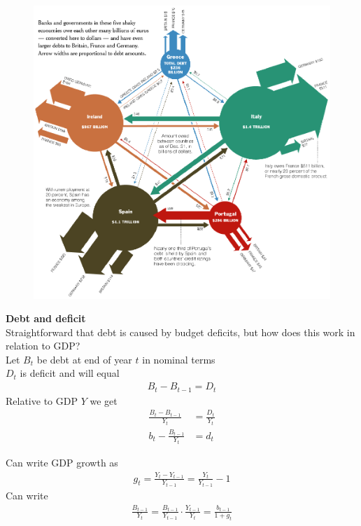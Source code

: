 \documentclass{beamer}
\begin{document}
\begin{frame}
  \begin{figure}
    \includegraphics[scale=.6]{debt_nyt.eps}
  \end{figure}
\end{frame}

\begin{frame}
  \textbf{Debt and deficit}\\
  Straightforward that debt is caused by budget deficits, but how does this work in relation to GDP?\\
  \medskip
  Let $B_t$ be debt at end of year $t$ in nominal terms\\
  $D_t$ is deficit and will equal
  \begin{align}
    B_t-B_{t-1}=D_t
 \end{align}  
  \medskip
  Relative to GDP $Y$ we get  
  \begin{align}
    \frac{B_t-B_{t-1}}{Y_t} &= \frac{D_t}{Y_t}\\
    b_t-\frac{B_{t-1}}{Y_t} &= d_t    
  \end{align}
\end{frame}

\begin{frame}
 Can write GDP growth as
 \begin{align}
   g_t=\frac{Y_t-Y_{t-1}}{Y_{t-1}}=\frac{Y_{t}}{Y_{t-1}}-1
 \end{align}
 \medskip
 Can write
 \begin{align}
   \frac{B_{t-1}}{Y_t} = \frac{B_{t-1}}{Y_{t-1}} \cdot \frac{Y_{t-1}}{Y_t} = \frac{b_{t-1}}{1+g_t}  
 \end{align}  
\end{frame}
\end{document}
